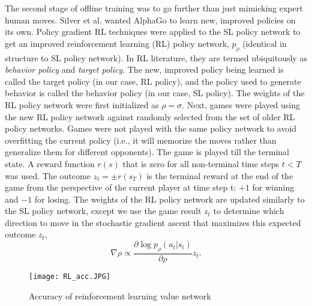 The second stage of offline training was to go further than just mimicking expert human moves. Silver et al.\cite{b12} wanted AlphaGo to learn new, improved policies on its own. Policy gradient RL techniques were applied to the SL policy network to get an improved reinforcement learning (RL) policy network, $p_\rho$ (identical in structure to SL policy network). In RL literature, they are termed ubiquitously as \textit{behavior policy} and \textit{target policy}. The new, improved policy being learned is called the target policy (in our case, RL policy), and the policy used to generate behavior is called the behavior policy (in our case, SL policy). The weights of the RL policy network were first initialized as $\rho = \sigma$. Next, games were played using the new RL policy network against randomly selected from the set of older RL policy networks. Games were not played with the same policy network to avoid overfitting the current policy (i.e., it will memorize the moves rather than generalize them for different opponents). The game is played till the terminal state. A reward function $r(s)$ that is zero for all non-terminal time steps $t<T$ was used. The outcome $z_t = \pm r(s_T)$ is the terminal reward at the end of the game from the perspective of the current player at time step t: $+1$ for winning and $-1$ for losing. The weights of the RL policy network are updated similarly to the SL policy network, except we use the game result $z_t$ to determine which direction to move in the stochastic gradient ascent that maximizes this expected outcome $z_t$,
\begin{equation}
    \nabla \rho \propto \frac{\partial \log p_\rho (a_t|s_t)}{\partial \rho}z_t.
\end{equation}

\begin{figure}[b]
\centerline{\texttt{[image: RL\_acc.JPG]}}
\caption{Accuracy of reinforcement learning value network\cite{b12}}
\label{RL_accu}
\end{figure}